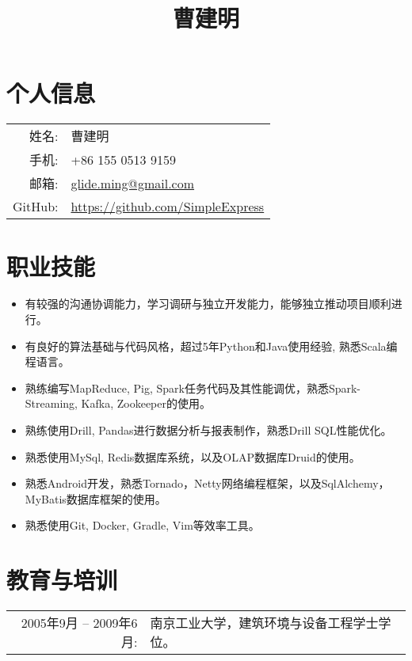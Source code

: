 \documentclass{ctexart}
\author{}
\title{\vspace{-1cm}曹建明}
\date{}
\begin{document}


\section*{个人信息}

\noindent\begin{tabular}{rl}
姓名: & 曹建明\\
手机: & +86 155 0513 9159\\
邮箱: & \href{mailto:glide.ming@gmail.com}{glide.ming@gmail.com}\\
{\sc GitHub:} & \href{https://github.com/SimpleExpress}{https://github.com/SimpleExpress}
\end{tabular}

\section*{职业技能}

\begin{itemize}
\item 有较强的沟通协调能力，学习调研与独立开发能力，能够独立推动项目顺利进行。
\item 有良好的算法基础与代码风格，超过5年Python和Java使用经验, 熟悉Scala编程语言。
\item 熟练编写MapReduce, Pig, Spark任务代码及其性能调优，熟悉Spark-Streaming, Kafka, Zookeeper的使用。
\item 熟练使用Drill, Pandas进行数据分析与报表制作，熟悉Drill SQL性能优化。
\item 熟悉使用MySql, Redis数据库系统，以及OLAP数据库Druid的使用。
\item 熟悉Android开发，熟悉Tornado，Netty网络编程框架，以及SqlAlchemy，MyBatis数据库框架的使用。
\item 熟悉使用Git, Docker, Gradle, Vim等效率工具。
\end{itemize}

\section*{教育与培训}

\noindent\begin{tabular}{rl}
2005年9月 -- 2009年6月: & 南京工业大学，建筑环境与设备工程学士学位。
\end{tabular}
\end{document}
